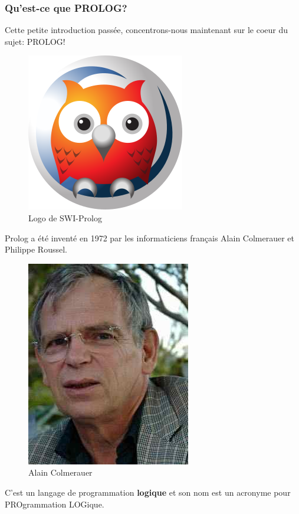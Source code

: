 \documentclass[a4paper, 12pt]{article}
\numberwithin{equation}{subsection}
\begin{document}
\subsubsection{Qu'est-ce que PROLOG?}
Cette petite introduction passée, concentrons-nous maintenant sur le coeur du sujet: PROLOG! \\
\begin{figure}
  \includegraphics[scale=0.3]{imgs/swi-prolog.png}
  \caption{Logo de SWI-Prolog}
\end{figure}

Prolog a été inventé en 1972 par les informaticiens français Alain Colmerauer et Philippe Roussel. \\
\begin{figure}
  \includegraphics[scale=0.5]{imgs/AlainColmerauer.jpeg}
  \caption{Alain Colmerauer}
\end{figure}

C'est un langage de programmation {\bf logique} et son nom est un acronyme pour PROgrammation LOGique. \\
\end{document}
